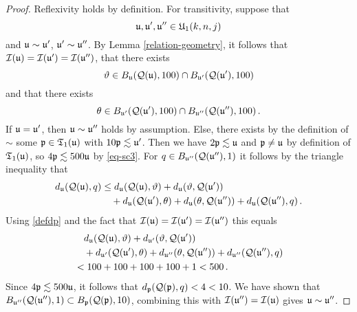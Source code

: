 {\begin{proof}
    Reflexivity holds by definition.
    For transitivity, suppose that
    \begin{equation*}
        \fu, \fu', \fu'' \in \fU_1(k,n,j)
    \end{equation*}
    and $\fu \sim \fu'$, $\fu' \sim \fu''$.
    By Lemma \ref{relation-geometry}, it follows that $\sc(\fu) =\sc(\fu') = \sc(\fu'')$, that there exists
    \begin{equation*}
        \mfa \in B_{\fu}(\fcc(\fu), 100) \cap B_{\fu'}(\fcc(\fu'), 100)
    \end{equation*}
    and that there exists
    \begin{equation*}
        \mfb \in B_{\fu'}(\fcc(\fu'), 100) \cap B_{\fu''}(\fcc(\fu''), 100)\, .
    \end{equation*}
    If $\fu = \fu'$, then $\fu \sim \fu''$ holds by assumption. Else, there exists by the definition of $\sim$ some $\fp \in \mathfrak{T}_1(\fu)$ with $10\fp\lesssim \fu'$.
    Then we have $2\fp \lesssim \fu$  and $\fp \ne \fu$ by definition of $\mathfrak{T}_1(\fu)$,  so $4 \fp \lesssim 500 \fu$ by \eqref{eq-sc3}. For $q \in B_{\fu''}(\fcc(\fu''), 1)$ it follows by the triangle inequality that
    \begin{align*}
        d_{\fu}(\fcc(\fu), q) &\le d_{\fu}(\fcc(\fu), \mfa) + d_{\fu}(\mfa, \fcc(\fu'))\\
        &\quad+ d_{\fu}(\fcc(\fu'), \mfb) + d_{\fu}(\mfb, \fcc(\fu'')) +
        d_{\fu}(\fcc(\fu''), q)\,.
    \end{align*}
    Using \eqref{defdp} and the fact that $\sc(\fu) = \sc(\fu') = \sc(\fu'')$ this equals
    \begin{align*}
        &\quad d_{\fu}(\fcc(\fu), \mfa) + d_{\fu'}(\mfa, \fcc(\fu'))\\
        &\quad+ d_{\fu'}(\fcc(\fu'), \mfb) + d_{\fu''}(\mfb, \fcc(\fu'')) +
        d_{\fu''}(\fcc(\fu''), q)\\
        &< 100 + 100 + 100 + 100 + 1 < 500\,.
    \end{align*}
    Since $4\fp \lesssim 500 \fu$, it follows that $d_{\fp}(\fcc(\fp), q) < 4 < 10$. We have shown that $B_{\fu''}(\fcc(\fu''), 1) \subset B_{\fp}(\fcc(\fp), 10)$, combining this with $\sc(\fu'') = \sc(\fu)$ gives $\fu \sim \fu''$.


\end{proof}}
